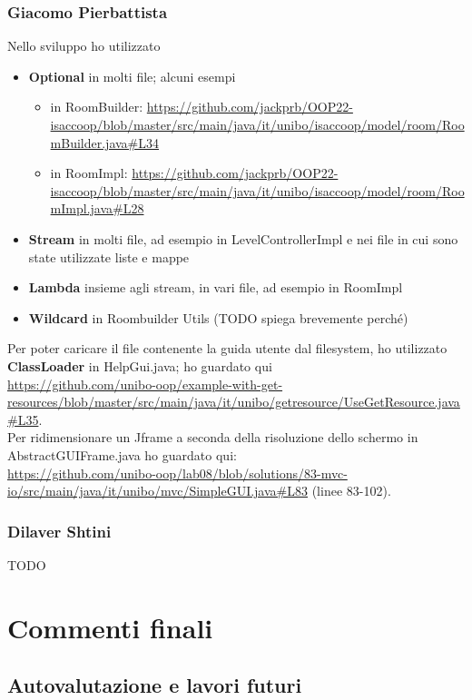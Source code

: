\documentclass[a4paper,12pt]{report}
\begin{document}
\subsection*{Giacomo Pierbattista}
Nello sviluppo ho utilizzato
\begin{itemize}
    \item \textbf{Optional} in molti file; alcuni esempi
    \begin{itemize}
        \item in RoomBuilder: \url{https://github.com/jackprb/OOP22-isaccoop/blob/master/src/main/java/it/unibo/isaccoop/model/room/RoomBuilder.java#L34}
        \item in RoomImpl: \url{https://github.com/jackprb/OOP22-isaccoop/blob/master/src/main/java/it/unibo/isaccoop/model/room/RoomImpl.java#L28}
    \end{itemize}
    \item \textbf{Stream} in molti file, ad esempio in LevelControllerImpl e nei file in cui sono state utilizzate liste e mappe
    \item \textbf{Lambda} insieme agli stream, in vari file, ad esempio in RoomImpl
    \item \textbf{Wildcard} in Roombuilder Utils ({TODO} spiega brevemente perché)
\end{itemize}
Per poter caricare il file contenente la guida utente dal filesystem, ho utilizzato \textbf{ClassLoader} in HelpGui.java; ho guardato qui 
\\\url{https://github.com/unibo-oop/example-with-get-resources/blob/master/src/main/java/it/unibo/getresource/UseGetResource.java#L35}.
\\Per ridimensionare un Jframe a seconda della risoluzione dello schermo in AbstractGUIFrame.java ho guardato qui: 
\\\url{https://github.com/unibo-oop/lab08/blob/solutions/83-mvc-io/src/main/java/it/unibo/mvc/SimpleGUI.java#L83} (linee 83-102).

\subsection*{Dilaver Shtini}
{TODO}



\chapter{Commenti finali}

\section{Autovalutazione e lavori futuri}
\end{document}
